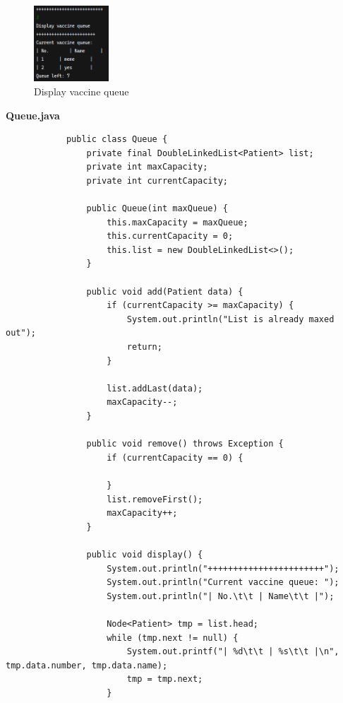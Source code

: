 \documentclass[12pt,titlepage]{article}
\begin{document}
\begin{enumerate}
{        \pagebreak

        \begin{figure}[h]
            \centering
            \includegraphics[width=0.25\textwidth]{./images/3-3.png}
            \caption{Display vaccine queue}
        \end{figure}

        \large{\textbf{Queue.java}}
        \begin{verbatim}
            public class Queue {
                private final DoubleLinkedList<Patient> list;
                private int maxCapacity;
                private int currentCapacity;

                public Queue(int maxQueue) {
                    this.maxCapacity = maxQueue;
                    this.currentCapacity = 0;
                    this.list = new DoubleLinkedList<>();
                }

                public void add(Patient data) {
                    if (currentCapacity >= maxCapacity) {
                        System.out.println("List is already maxed out");
                        return;
                    }

                    list.addLast(data);
                    maxCapacity--;
                }

                public void remove() throws Exception {
                    if (currentCapacity == 0) {

                    }
                    list.removeFirst();
                    maxCapacity++;
                }

                public void display() {
                    System.out.println("+++++++++++++++++++++++");
                    System.out.println("Current vaccine queue: ");
                    System.out.println("| No.\t\t | Name\t\t |");

                    Node<Patient> tmp = list.head;
                    while (tmp.next != null) {
                        System.out.printf("| %d\t\t | %s\t\t |\n", tmp.data.number, tmp.data.name);
                        tmp = tmp.next;
                    }


\end{verbatim}}
\end{enumerate}
\end{document}
